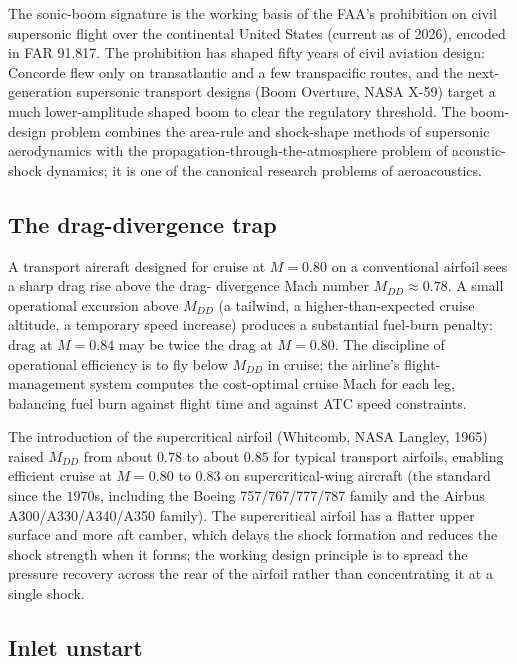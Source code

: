 The sonic-boom signature is the working basis of the FAA's
prohibition on civil supersonic flight over the continental
United States (current as of 2026), encoded in FAR 91.817. The
prohibition has shaped fifty years of civil aviation design:
Concorde flew only on transatlantic and a few transpacific routes,
and the next-generation supersonic transport designs (Boom
Overture, NASA X-59) target a much lower-amplitude shaped boom to
clear the regulatory threshold. The boom-design problem combines
the area-rule and shock-shape methods of supersonic aerodynamics
with the propagation-through-the-atmosphere problem of
acoustic-shock dynamics; it is one of the canonical research
problems of aeroacoustics.

\subsection{The drag-divergence trap}

A transport aircraft designed for cruise at $M = 0.80$ on a
conventional airfoil sees a sharp drag rise above the drag-
divergence Mach number $M_{DD} \approx 0.78$. A small operational
excursion above $M_{DD}$ (a tailwind, a higher-than-expected
cruise altitude, a temporary speed increase) produces a
substantial fuel-burn penalty: drag at $M = 0.84$ may be twice the
drag at $M = 0.80$. The discipline of operational efficiency is
to fly below $M_{DD}$ in cruise; the airline's flight-management
system computes the cost-optimal cruise Mach for each leg, balancing
fuel burn against flight time and against ATC speed constraints.

The introduction of the supercritical airfoil (Whitcomb, NASA
Langley, 1965) raised $M_{DD}$ from about $0.78$ to about $0.85$
for typical transport airfoils, enabling efficient cruise at
$M = 0.80$ to $0.83$ on supercritical-wing aircraft (the standard
since the $1970$s, including the Boeing 757/767/777/787 family and
the Airbus A300/A330/A340/A350 family). The supercritical airfoil
has a flatter upper surface and more aft camber, which delays the
shock formation and reduces the shock strength when it forms; the
working design principle is to spread the pressure recovery
across the rear of the airfoil rather than concentrating it at a
single shock.

\subsection{Inlet unstart}

